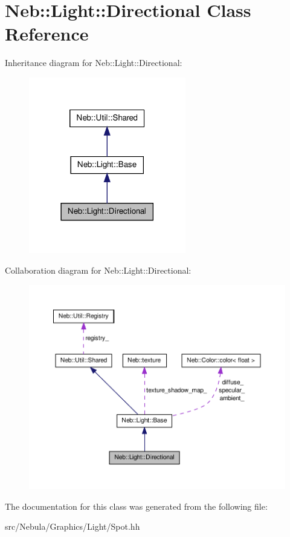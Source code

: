 \hypertarget{classNeb_1_1Light_1_1Directional}{\section{\-Neb\-:\-:\-Light\-:\-:\-Directional \-Class \-Reference}
\label{classNeb_1_1Light_1_1Directional}
}


\-Inheritance diagram for \-Neb\-:\-:\-Light\-:\-:\-Directional\-:\nopagebreak
\begin{figure}[H]
\begin{center}
\leavevmode
\includegraphics[width=194pt]{classNeb_1_1Light_1_1Directional__inherit__graph}
\end{center}
\end{figure}


\-Collaboration diagram for \-Neb\-:\-:\-Light\-:\-:\-Directional\-:\nopagebreak
\begin{figure}[H]
\begin{center}
\leavevmode
\includegraphics[width=350pt]{classNeb_1_1Light_1_1Directional__coll__graph}
\end{center}
\end{figure}


\-The documentation for this class was generated from the following file\-:\begin{DoxyCompactItemize}
\item 
src/\-Nebula/\-Graphics/\-Light/\-Spot.\-hh\end{DoxyCompactItemize}
